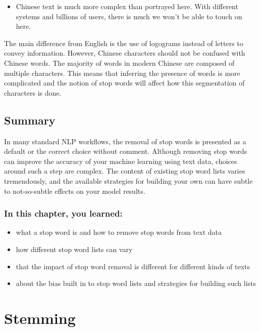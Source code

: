 \documentclass[
]{krantz}
\newenvironment{rmdblock}[1]
  {\begin{shaded*}
  \begin{itemize}[left = -1cm, labelsep = 1cm]
  \renewcommand{\labelitemi}{
    \raisebox{-.7\height}[0pt][0pt]{
      {\setkeys{Gin}{width=3em,keepaspectratio}\texttt{[image: images/\#1]}}
    }
  }
 
  \item
  }
  {
  \end{itemize}
  \end{shaded*}
  }
\newenvironment{rmdwarning}
  {\begin{rmdblock}{warning}}
  {\end{rmdblock}}
\begin{document}
\begin{rmdwarning}
Chinese text is much more complex than portrayed here. With different
systems and billions of users, there is much we won't be able to touch
on here.
\end{rmdwarning}

The main difference from English is the use of logograms instead of letters to convey information. However, Chinese characters should not be confused with Chinese words. The majority of words in modern Chinese are composed of multiple characters. This means that inferring the presence of words is more complicated and the notion of stop words will affect how this segmentation of characters is done.

\hypertarget{stopwordssummary}{%
\section{Summary}\label{stopwordssummary}}

In many standard NLP workflows, the removal of stop words is presented as a default or the correct choice without comment. Although removing stop words can improve the accuracy of your machine learning using text data, choices around such a step are complex. The content of existing stop word lists varies tremendously, and the available strategies for building your own can have subtle to not-so-subtle effects on your model results.

\hypertarget{in-this-chapter-you-learned-2}{%
\subsection{In this chapter, you learned:}\label{in-this-chapter-you-learned-2}}

\begin{itemize}
\item
  what a stop word is and how to remove stop words from text data
\item
  how different stop word lists can vary
\item
  that the impact of stop word removal is different for different kinds of texts
\item
  about the bias built in to stop word lists and strategies for building such lists
\end{itemize}

\hypertarget{stemming}{%
\chapter{Stemming}\label{stemming}}
\end{document}
